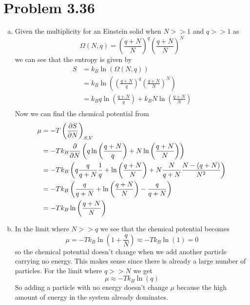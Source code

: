 \documentclass[11pt]{article}
\numberwithin{equation}{section}
\begin{document}
\section{Problem 3.36}
\begin{enumerate}[(a)]
\item
Given the multiplicity for an Einstein solid when $N>>1$ and $q>>1$ as
$$\Omega(N,q) = \left(\frac{q+N}{N}\right)^q\left(\frac{q+N}{N}\right)^{N}$$
we can see that the entropy is given by
\begin{align*}
S &= k_B\ln(\Omega(N,q))\\
&= k_B\ln\left(\left(\frac{q+N}{q}\right)^q\left(\frac{q+N}{N}\right)^{N}\right)\\
&= k_Bq\ln\left(\frac{q+N}{q}\right) + k_BN\ln\left(\frac{q+N}{N}\right)\\
\end{align*}
Now we can find the chemical potential from
\begin{align*}
\mu &= -T\left(\frac{\partial{S}}{\partial{N}}\right)_{S,V}\\
&= -Tk_B\frac{\partial{}}{\partial{N}}\left(q\ln\left(\frac{q+N}{q}\right) + N\ln\left(\frac{q+N}{N}\right)\right)\\
&= -Tk_B\left(q\frac{q}{q+N}\frac{1}{q} + \ln\left(\frac{q+N}{N}\right) + N\frac{N}{q+N}\frac{N-(q+N)}{N^2}\right)\\
&= -Tk_B\left(\frac{q}{q+N} + \ln\left(\frac{q+N}{N}\right) - \frac{q}{q+N}\right)\\
&= -Tk_B\ln\left(\frac{q+N}{N}\right)
\end{align*}

\item
In the limit where $N>>q$ we see that the chemical potential becomes
$$\mu = -Tk_B\ln\left(1+\frac{q}{N}\right)\approx -Tk_B\ln(1) = 0$$
so the chemical potential doesn't change when we add another particle carrying no energy. This makes sense since there is already a large number of particles. For the limit where $q>>N$ we get
$$\mu \approx -Tk_B\ln(q)$$
So adding a particle with no energy doesn't change $\mu$ because the high amount of energy in the system already dominates.
\end{enumerate}
\end{document}
